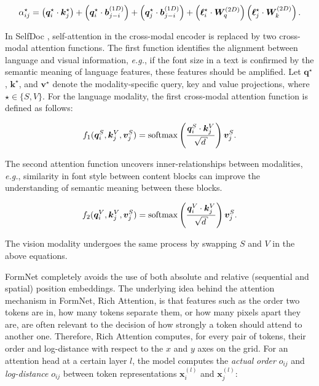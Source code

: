 \begin{equation}
    \alpha^{\star}_{ij} = \left(\bm{q}^{\star}_i \cdot \bm{k}^{\star}_j\right) + \left(\bm{q}^{\star}_i \cdot \bm{b}^{(1D)}_{j-i}\right) + \left(\bm{q}^{\star}_j \cdot \bm{b}^{(1D)}_{j-i}\right) + \left(\boldsymbol{\ell}^{\star}_i \cdot \bm{W}^{(2D)}_q \right) \left(\boldsymbol{\ell}^{\star}_j \cdot \bm{W}^{(2D)}_k \right).
\end{equation}

In SelfDoc \citep{li2021selfdoc}, self-attention in the cross-modal encoder is replaced by two cross-modal attention functions. The first function identifies the alignment between language and visual information, \textit{e.g.}, if the font size in a text is confirmed by the semantic meaning of language features, these features should be amplified. Let $\bm{q}^\star$, $\bm{k}^\star$, and $\bm{v}^\star$ denote the modality-specific query, key and value projections, where $\star \in \{S, V\}$. For the language modality, the first cross-modal attention function is defined as follows:

\begin{equation}
    f_{1}(\bm{q}^S_i, \bm{k}^V_j, \bm{v}^S_j) = \softmax \left( \dfrac{\bm{q}^S_i \cdot \bm{k}^V_j}{\sqrt{d}}\right) \bm{v}^S_j.
\end{equation}

\noindent The second attention function uncovers inner-relationships between modalities, \textit{e.g.}, similarity in font style between content blocks can improve the understanding of semantic meaning between these blocks.

\begin{equation}
    f_{2}(\bm{q}^V_i, \bm{k}^V_j, \bm{v}^S_j) = \softmax \left( \dfrac{\bm{q}^V_i \cdot \bm{k}^V_j}{\sqrt{d}}\right) \bm{v}^S_j.
\end{equation}

\noindent The vision modality undergoes the same process by swapping $S$ and $V$ in the above equations.

FormNet \citep{lee2022formnet} completely avoids the use of both absolute and relative (sequential and spatial) position embeddings. The underlying idea behind the attention mechanism in FormNet, Rich Attention, is that features such as the order two tokens are in, how many tokens separate them, or how many pixels apart they are, are often relevant to the decision of how strongly a token should attend to another one. Therefore, Rich Attention computes, for every pair of tokens, their order and log-distance with respect to the $x$ and $y$ axes on the grid. For an attention head at a certain layer $l$, the model computes the \textit{actual} \textit{order} $o_{ij}$ and \textit{log-distance} $o_{ij}$ between token representations $\bm{x}^{(l)}_i$ and $\bm{x}^{(l)}_j$:

